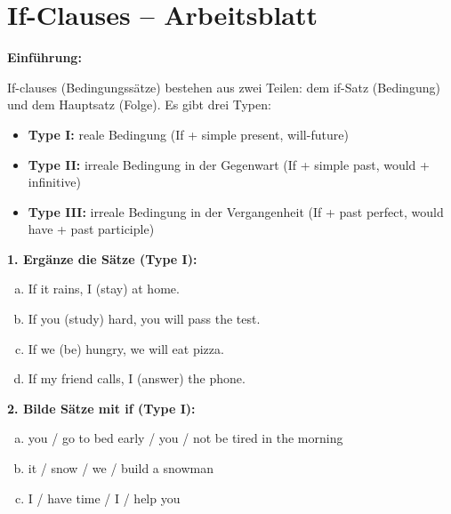 \section*{If-Clauses – Arbeitsblatt}

\textbf{Einführung:}

If-clauses (Bedingungssätze) bestehen aus zwei Teilen: dem if-Satz (Bedingung) und dem Hauptsatz (Folge). Es gibt drei Typen:

\begin{itemize}
    \item \textbf{Type I:} reale Bedingung (If + simple present, will-future)
    \item \textbf{Type II:} irreale Bedingung in der Gegenwart (If + simple past, would + infinitive)
    \item \textbf{Type III:} irreale Bedingung in der Vergangenheit (If + past perfect, would have + past participle)
\end{itemize}

\vspace{0.5em}

\textbf{1. Ergänze die Sätze (Type I):}

\begin{enumerate}[a)]
    \item If it rains, I \underline{\hspace{2cm}} (stay) at home.
    \item If you \underline{\hspace{2cm}} (study) hard, you will pass the test.
    \item If we \underline{\hspace{2cm}} (be) hungry, we will eat pizza.
    \item If my friend calls, I \underline{\hspace{2cm}} (answer) the phone.
\end{enumerate}


\vspace{0.5em}

\textbf{2. Bilde Sätze mit if (Type I):}
\begin{enumerate}[a)]
    \item you / go to bed early / you / not be tired in the morning
    \item it / snow / we / build a snowman
    \item I / have time / I / help you
\end{enumerate}

\vspace{0.5em}

